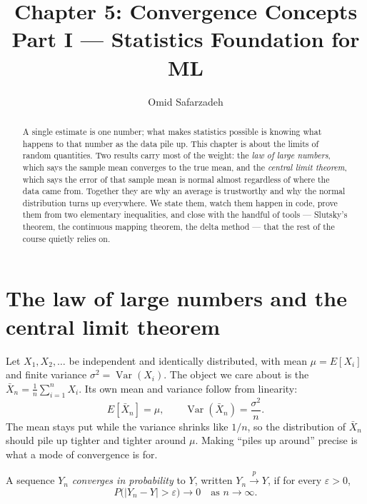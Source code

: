 \documentclass[11pt]{article}
\title{Chapter 5: Convergence Concepts \\ \large Part I --- Statistics Foundation for ML}
\author{Omid Safarzadeh}
\date{}
\begin{document}
\maketitle

\begin{abstract}
\noindent
A single estimate is one number; what makes statistics possible is knowing
what happens to that number as the data pile up. This chapter is about the
limits of random quantities. Two results carry most of the weight: the
\emph{law of large numbers}, which says the sample mean converges to the true
mean, and the \emph{central limit theorem}, which says the error of that
sample mean is normal almost regardless of where the data came from. Together
they are why an average is trustworthy and why the normal distribution turns
up everywhere. We state them, watch them happen in code, prove them from two
elementary inequalities, and close with the handful of tools --- Slutsky's
theorem, the continuous mapping theorem, the delta method --- that the rest
of the course quietly relies on.
\end{abstract}

\tableofcontents

\section{The law of large numbers and the central limit theorem}

Let $X_1, X_2, \dots$ be independent and identically distributed, with mean
$\mu = E[X_i]$ and finite variance $\sigma^2 = \operatorname{Var}(X_i)$. The
object we care about is the 
$\bar X_n = \frac1n \sum_{i=1}^n X_i$. Its own mean and variance follow from
linearity:
\[
  E[\bar X_n] = \mu, \qquad \operatorname{Var}(\bar X_n) = \frac{\sigma^2}{n}.
\]
The mean stays put while the variance shrinks like $1/n$, so the distribution
of $\bar X_n$ should pile up tighter and tighter around $\mu$. Making
``piles up around'' precise is what a mode of convergence is for.

\begin{definition}
A sequence $Y_n$ \emph{converges in probability} to $Y$, written
$Y_n \xrightarrow{p} Y$, if for every $\varepsilon > 0$,
\[
  P\big(|Y_n - Y| > \varepsilon\big) \longrightarrow 0 \quad\text{as } n\to\infty.
\]
\end{definition}
\end{document}

